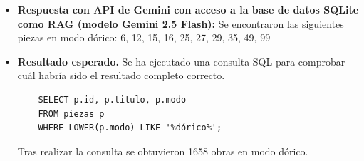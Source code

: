 \begin{itemize}
Si deseas, puedo intentar buscar pistas adicionales en el archivo xml para ver si hay alguna indicación de que las piezas tengan un tono dórico."
    \item \textbf{Respuesta con API de Gemini con acceso a la base de datos SQLite como RAG (modelo Gemini 2.5 Flash):} Se encontraron las siguientes piezas en modo dórico: 6, 12, 15, 16, 25, 27, 29, 35, 49, 99
    \item \textbf{Resultado esperado.} Se ha ejecutado una consulta SQL para comprobar cuál habría sido el resultado completo correcto.
    \begin{verbatim}
    SELECT p.id, p.titulo, p.modo
    FROM piezas p
    WHERE LOWER(p.modo) LIKE '%dórico%';
    \end{verbatim}  
    Tras realizar la consulta se obtuvieron 1658 obras en modo dórico.  

\end{itemize}

